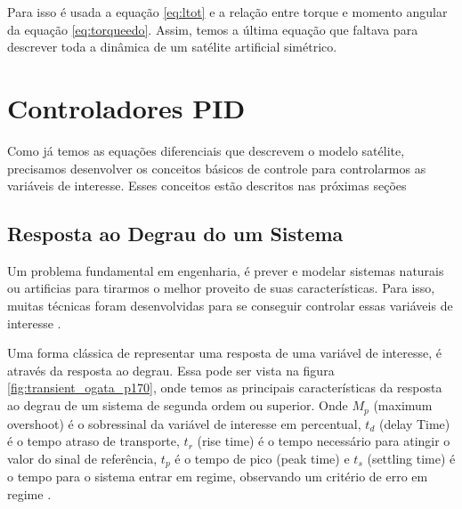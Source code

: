Para isso é usada a equação \ref{eq:ltot} e a relação entre torque e momento angular da equação \ref{eq:torqueedo}. Assim, temos a última equação que faltava para descrever toda a dinâmica de um satélite artificial simétrico. 



\section{Controladores PID}

Como já temos as equações diferenciais que descrevem o modelo satélite, precisamos desenvolver os conceitos básicos de controle para controlarmos as variáveis de interesse. Esses conceitos estão descritos nas próximas seções



\subsection{Resposta ao Degrau do um Sistema}

Um problema fundamental em engenharia, é prever e modelar sistemas naturais ou artificias para tirarmos o melhor proveito de suas características. Para isso, muitas técnicas foram desenvolvidas para se conseguir controlar essas variáveis de interesse \cite{Levine1996}.

Uma forma clássica de representar uma resposta de uma variável de interesse, é através da resposta ao degrau. Essa pode ser vista na figura \ref{fig:transient_ogata_p170}, onde temos as principais características da resposta ao degrau de um sistema de segunda ordem ou superior. Onde \textit{$M_p$} (maximum overshoot) é o sobressinal da variável de interesse em percentual, \textit{$t_d$} (delay Time) é o tempo atraso de transporte, \textit{$t_r$} (rise time) é o tempo necessário para atingir o valor do sinal de referência, \textit{$t_p$} é o tempo de pico (peak time) e \textit{$t_s$} (settling time) é o tempo para o sistema entrar em regime, observando um critério de erro em regime \cite{Ogata}.

